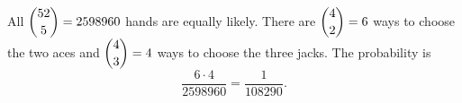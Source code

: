 All $\dbinom{52}5=2598960$ hands are equally likely. There are $\dbinom42=6$ ways to choose the two aces and $\dbinom43=4$ ways to choose the three jacks. The probability is
\[\dfrac{6\cdot4}{2598960}=\boxed{\dfrac{1}{108290}}.\]
